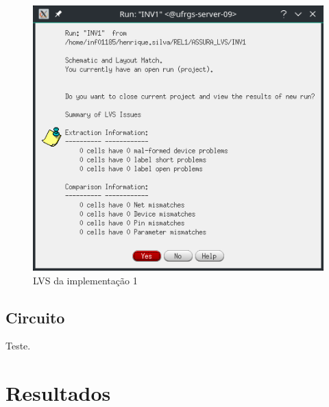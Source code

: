 \documentclass{iiufrgs}
\begin{document}
\begin{figure}[htbp]
    \centering
    \caption{LVS da implementação 1}
    \includegraphics[scale=0.8]{images/LVS_2.png}

    \label{fig:LVS1}
\end{figure}

\section{Circuito}
Teste.

\chapter{Resultados}\label{resultados} %







\end{document}
